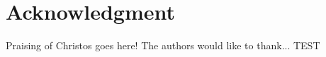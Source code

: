 \documentclass[journal]{IEEEtran}
\begin{document}
	
	\section*{Acknowledgment}
	
	Praising of Christos goes here!
	The authors would like to thank...
	TEST
	
	
	\ifCLASSOPTIONcaptionsoff
	\newpage
	\fi
	
	
	
	
	
	
	
	
	
	
	
	
	
	
	
\end{document}
